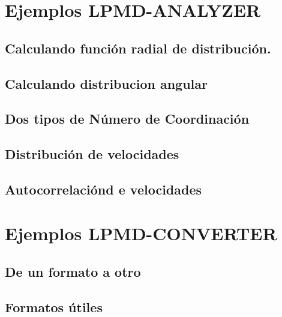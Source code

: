 \section{Ejemplos LPMD-ANALYZER}

\subsection{Calculando funci\'on radial de distribuci\'on.}

\subsection{Calculando distribucion angular}

\subsection{Dos tipos de N\'umero de Coordinaci\'on}

\subsection{Distribuci\'on de velocidades}

\subsection{Autocorrelaci\'ond e velocidades}

\section{Ejemplos LPMD-CONVERTER}

\subsection{De un formato a otro}

\subsection{Formatos \'utiles}
